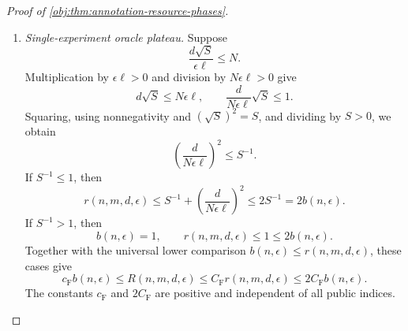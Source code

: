 \begin{proof}[Proof of \cref{obj:thm:annotation-resource-phases}]
\begin{enumerate}
\item \emph{Single-experiment oracle plateau.}
Suppose
\[
\frac{d\sqrt S}{\epsilon\ell}\le N.
\]
Multiplication by \(\epsilon\ell>0\) and division by
\(N\epsilon\ell>0\) give
\[
d\sqrt S\le N\epsilon\ell,
\qquad
\frac{d}{N\epsilon\ell}\sqrt S\le1.
\]
Squaring, using nonnegativity and \((\sqrt S)^2=S\), and dividing by \(S>0\), we obtain
\[
\left(\frac{d}{N\epsilon\ell}\right)^2\le S^{-1}.
\]
If \(S^{-1}\le1\), then
\[
r(n,m,d,\epsilon)
\le S^{-1}+\left(\frac{d}{N\epsilon\ell}\right)^2
\le2S^{-1}
=2b(n,\epsilon).
\]
If \(S^{-1}>1\), then
\[
b(n,\epsilon)=1,\qquad
r(n,m,d,\epsilon)\le1\le2b(n,\epsilon).
\]
Together with the universal lower comparison
\(b(n,\epsilon)\le r(n,m,d,\epsilon)\), these cases give
\[
c_{\mathrm F}b(n,\epsilon)
\le R(n,m,d,\epsilon)
\le C_{\mathrm F}r(n,m,d,\epsilon)
\le2C_{\mathrm F}b(n,\epsilon).
\]
The constants \(c_{\mathrm F}\) and \(2C_{\mathrm F}\) are positive and independent of all public indices.
\end{enumerate}
\end{proof}
